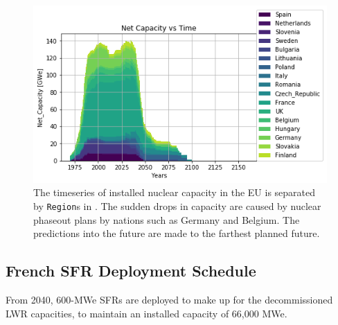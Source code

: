 \begin{figure}[htbp!]
    \begin{center}
        \includegraphics[scale=0.6]{./images/eu_future/power_plot.png}
    \end{center}
    \caption{The timeseries of installed nuclear capacity in the EU is separated by \texttt{Region}s in \Cyclus.
             The sudden drops in capacity are caused by nuclear phaseout plans by nations such as Germany and Belgium.
             The predictions into the future are made to the farthest planned future.
             }
    \label{fig:eu_pow}
\end{figure}



\subsection{French \gls{SFR} Deployment Schedule}

From 2040,
600-\gls{MWe} \glspl{SFR} are deployed to make up for the 
decommissioned \gls{LWR} capacities, to maintain an installed 
capacity of 66,000 \gls{MWe}. 


